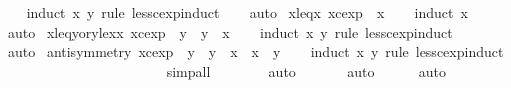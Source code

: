 \begin{isabellebody}
%
\isadelimproof
\ \ %
\endisadelimproof
%
\isatagproof
{}\isamarkupfalse%
\ {\isacharparenleft}induct\ x\ y\ rule{\isacharcolon}\ less{\isacharunderscore}cexp{\isachardot}induct{\isacharparenright}\isanewline
\ \ \isamarkupfalse%
\ auto%
\endisatagproof
{\isafoldproof}%
%
\isadelimproof
\isanewline
%
\endisadelimproof
\isanewline
{}\isamarkupfalse%
\ x{\isacharunderscore}leq{\isacharunderscore}x{\isacharcolon}\ {\isachardoublequoteopen}{\isacharparenleft}x{\isacharcolon}{\isacharcolon}cexp{\isacharparenright}\ {\isasymle}\ x{\isachardoublequoteclose}\isanewline
%
\isadelimproof
\ \ %
\endisadelimproof
%
\isatagproof
{}\isamarkupfalse%
\ {\isacharparenleft}induct\ x{\isacharparenright}\isanewline
\ \ \isamarkupfalse%
\ auto%
\endisatagproof
{\isafoldproof}%
%
\isadelimproof
\isanewline
%
\endisadelimproof
\isanewline
{}\isamarkupfalse%
\ x{\isacharunderscore}leq{\isacharunderscore}y{\isacharunderscore}or{\isacharunderscore}y{\isacharunderscore}lex{\isacharunderscore}x{\isacharcolon}\ {\isachardoublequoteopen}{\isacharparenleft}x{\isacharcolon}{\isacharcolon}cexp{\isacharparenright}\ {\isasymle}\ y\ {\isasymor}\ y\ {\isasymle}\ x{\isachardoublequoteclose}\isanewline
%
\isadelimproof
\ \ %
\endisadelimproof
%
\isatagproof
{}\isamarkupfalse%
\ {\isacharparenleft}induct\ x\ y\ rule{\isacharcolon}\ less{\isacharunderscore}cexp{\isachardot}induct{\isacharparenright}\isanewline
\ \ \isamarkupfalse%
\ auto%
\endisatagproof
{\isafoldproof}%
%
\isadelimproof
\isanewline
%
\endisadelimproof
\isanewline
{}\isamarkupfalse%
\ antisymmetry{\isacharcolon}\ {\isachardoublequoteopen}{\isacharparenleft}x{\isacharcolon}{\isacharcolon}cexp{\isacharparenright}\ {\isasymle}\ y\ {\isasymLongrightarrow}\ y\ {\isasymle}\ x\ {\isasymLongrightarrow}\ x\ {\isacharequal}\ y{\isachardoublequoteclose}\isanewline
%
\isadelimproof
\ \ %
\endisadelimproof
%
\isatagproof
{}\isamarkupfalse%
\ {\isacharparenleft}induct\ x\ y\ rule{\isacharcolon}\ less{\isacharunderscore}cexp{\isachardot}induct{\isacharparenright}\isanewline
\ \ \ \ \ \ \ \ \ \ \ \ \ \ \ \ \ \ \ \ \ \ \isamarkupfalse%
\ simp{\isacharunderscore}all\isanewline
\ \ \ \ \ \ \isamarkupfalse%
\ auto{\isacharbrackleft}{}{\isacharbrackright}\isanewline
\ \ \ \ \ \isamarkupfalse%
\ auto{\isacharbrackleft}{}{\isacharbrackright}\isanewline
\ \ \ \ \isamarkupfalse%
\ auto{\isacharbrackleft}{}{\isacharbrackright}\isanewline

\end{isabellebody}
